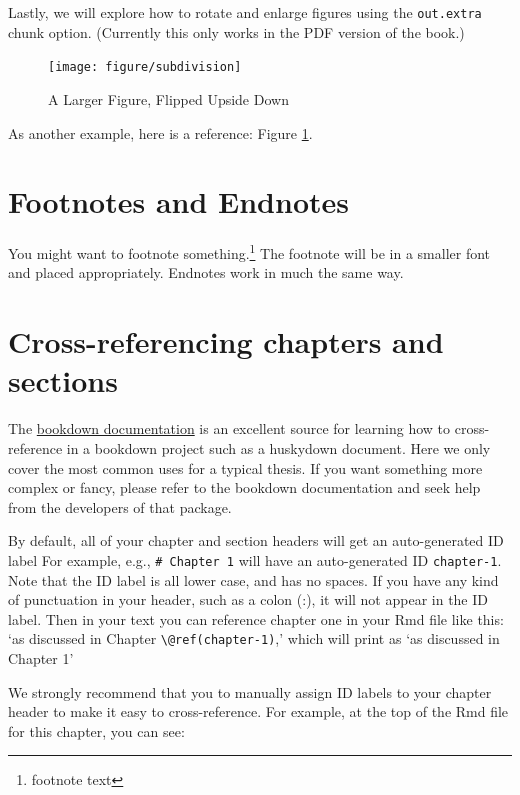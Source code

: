 \documentclass [11pt, proquest] {uwthesis}[2015/03/03]
\begin{document}
Lastly, we will explore how to rotate and enlarge figures using the \texttt{out.extra} chunk option. (Currently this only works in the PDF version of the book.)
\begin{figure}
\texttt{[image: figure/subdivision]} \caption{A Larger Figure, Flipped Upside Down}\label{fig:subd2}
\end{figure}
As another example, here is a reference: Figure \ref{fig:subd2}.

\hypertarget{footnotes-and-endnotes}{%
\section{Footnotes and Endnotes}\label{footnotes-and-endnotes}}

You might want to footnote something.\footnote{footnote text} The footnote will be in a smaller font and placed appropriately. Endnotes work in much the same way.

\hypertarget{cross-referencing-chapters-and-sections}{%
\section{Cross-referencing chapters and sections}\label{cross-referencing-chapters-and-sections}}

The \href{https://bookdown.org/yihui/bookdown/cross-references.html}{bookdown documentation} is an excellent source for learning how to cross-reference in a bookdown project such as a huskydown document. Here we only cover the most common uses for a typical thesis. If you want something more complex or fancy, please refer to the bookdown documentation and seek help from the developers of that package.

By default, all of your chapter and section headers will get an auto-generated ID label For example, e.g., \texttt{\#\ Chapter\ 1} will have an auto-generated ID \texttt{chapter-1}. Note that the ID label is all lower case, and has no spaces. If you have any kind of punctuation in your header, such as a colon (:), it will not appear in the ID label. Then in your text you can reference chapter one in your Rmd file like this: `as discussed in Chapter \texttt{\textbackslash{}@ref(chapter-1)},' which will print as `as discussed in Chapter 1'

We strongly recommend that you to manually assign ID labels to your chapter header to make it easy to cross-reference. For example, at the top of the Rmd file for this chapter, you can see:
\end{document}
